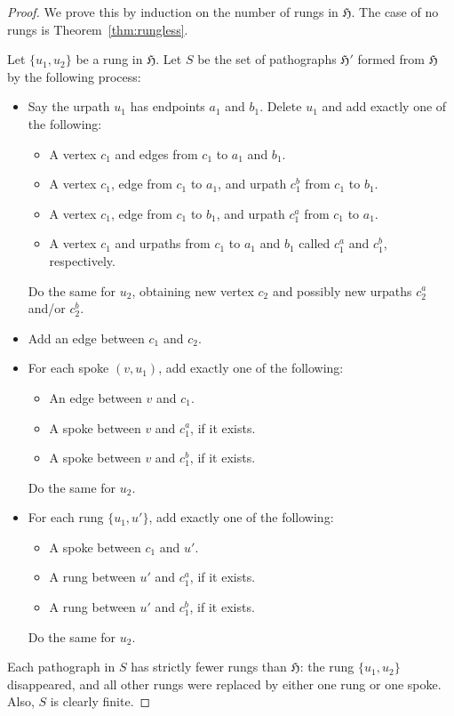 \documentclass{article}
\newcommand{\Hf}{\mathfrak{H}}
\begin{document}
\begin{proof}
We prove this by induction on the number of rungs in $\Hf$. The case of no rungs is Theorem~\ref{thm:rungless}.

Let $\{u_1,u_2\}$ be a rung in $\Hf$. Let $S$ be the set of pathographs $\Hf'$ formed from $\Hf$ by the following process:
\begin{itemize}
    \item Say the urpath $u_1$ has endpoints $a_1$ and $b_1$. Delete $u_1$ and add exactly one of the following:
    \begin{itemize}
        \item A vertex $c_1$ and edges from $c_1$ to $a_1$ and $b_1$.
        \item A vertex $c_1$, edge from $c_1$ to $a_1$, and urpath $c_1^b$ from $c_1$ to $b_1$.
        \item A vertex $c_1$, edge from $c_1$ to $b_1$, and urpath $c_1^a$ from $c_1$ to $a_1$.
        \item A vertex $c_1$ and urpaths from $c_1$ to $a_1$ and $b_1$ called $c_1^a$ and $c_1^b$, respectively.
    \end{itemize}
    Do the same for $u_2$, obtaining new vertex $c_2$ and possibly new urpaths $c_2^a$ and/or $c_2^b$.
    \item Add an edge between $c_1$ and $c_2$.
    \item For each spoke $(v,u_1)$, add exactly one of the following:
    \begin{itemize}
        \item An edge between $v$ and $c_1$.
        \item A spoke between $v$ and $c_1^a$, if it exists.
        \item A spoke between $v$ and $c_1^b$, if it exists.
    \end{itemize}
    Do the same for $u_2$.
    \item For each rung $\{u_1,u'\}$, add exactly one of the following:
    \begin{itemize}
        \item A spoke between $c_1$ and $u'$.
        \item A rung between $u'$ and $c_1^a$, if it exists.
        \item A rung between $u'$ and $c_1^b$, if it exists.
    \end{itemize}
    Do the same for $u_2$.
\end{itemize}

Each pathograph in $S$ has strictly fewer rungs than $\Hf$: the rung $\{u_1,u_2\}$ disappeared, and all other rungs were replaced by either one rung or one spoke. Also, $S$ is clearly finite.


\end{proof}
\end{document}
